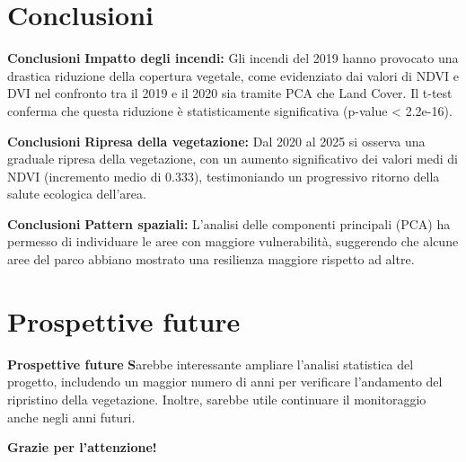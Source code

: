 \documentclass{beamer}
\begin{document}
\section{Conclusioni}
\begin{frame}[fragile]{\textbf{Conclusioni}}
\textbf{Impatto degli incendi:} Gli incendi del 2019 hanno provocato una drastica riduzione della copertura vegetale, come evidenziato dai valori di NDVI e DVI nel confronto tra il 2019 e il 2020 sia tramite PCA che Land Cover. Il t-test conferma che questa riduzione è statisticamente significativa (p-value < 2.2e-16).
\end{frame}

\begin{frame}[fragile]{\textbf{Conclusioni}}
\textbf{Ripresa della vegetazione:} Dal 2020 al 2025 si osserva una graduale ripresa della vegetazione, con un aumento significativo dei valori medi di NDVI (incremento medio di 0.333), testimoniando un progressivo ritorno della salute ecologica dell'area.
\end{frame}

\begin{frame}[fragile]{\textbf{Conclusioni}}
\textbf{Pattern spaziali:} L’analisi delle componenti principali (PCA) ha permesso di individuare le aree con maggiore vulnerabilità, suggerendo che alcune aree del parco abbiano mostrato una resilienza maggiore rispetto ad altre.
\end{frame}

\section{Prospettive future}
\begin{frame}[fragile]{\textbf{Prospettive future}}
\textbf Sarebbe interessante ampliare l'analisi statistica del progetto, includendo un maggior numero di anni per verificare l'andamento del ripristino della vegetazione. 
Inoltre, sarebbe utile continuare il monitoraggio anche negli anni futuri.  
\end{frame}

\begin{frame}{}
\centering
\textbf{Grazie per l'attenzione!}
\end{frame}
\end{document}
